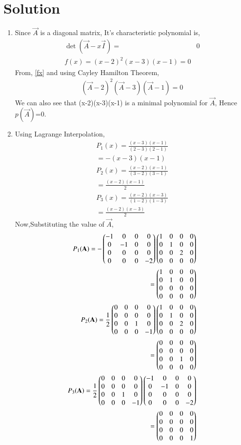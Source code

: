 \documentclass[journal,12pt,twocolumn]{IEEEtran}
\begin{document}
\section{\textbf{Solution}}
\begin{enumerate}
\item{
Since $\vec{A}$ is a diagonal matrix, It's characteristic polynomial is,
\begin{align}
\det{(\vec{A} - x \vec{I})} =&0\\
f(x)=(x-2)^2(x-3)(x-1)=0\label{fx}
\end{align}
From, \eqref{fx} and using Cayley Hamilton Theorem,
\begin{align}
(\vec{A}-2)^2(\vec{A}-3)(\vec{A}-1)=0
\end{align}
We can also see that (x-2)(x-3)(x-1) is a minimal polynomial for $\vec{A}$, Hence $p(\vec{A})$=0.}
\item{Using Lagrange Interpolation,
\begin{align}
P_1(x)=\frac{(x-3)(x-1)}{(2-3)(2-1)}\\
=-(x-3)(x-1)\\
P_2(x)=\frac{(x-2)(x-1)}{(3-2)(3-1)}\\
=\frac{(x-2)(x-1)}{2}\\
P_3(x)=\frac{(x-2)(x-3)}{(1-2)(1-3)}\\
=\frac{(x-2)(x-3)}{2}
\end{align}
Now,Substituting the value of $\vec{A}$,
\begin{align}
P_1(\mathbf{A})=-\begin{pmatrix}-1&0&0&0\\0&-1&0&0\\0&0&0&0\\0&0&0&-2\end{pmatrix}\begin{pmatrix}1&0&0&0\\0&1&0&0\\0&0&2&0\\0&0&0&0\end{pmatrix}\\=\begin{pmatrix}1&0&0&0\\0&1&0&0\\0&0&0&0\\0&0&0&0\end{pmatrix}\\
P_2(\mathbf{A})=\frac{1}{2}\begin{pmatrix}0&0&0&0\\0&0&0&0\\0&0&1&0\\0&0&0&-1\end{pmatrix}\begin{pmatrix}1&0&0&0\\0&1&0&0\\0&0&2&0\\0&0&0&0\end{pmatrix}\\=\begin{pmatrix}0&0&0&0\\0&0&0&0\\0&0&1&0\\0&0&0&0\end{pmatrix}\\
P_3(\mathbf{A})=\frac{1}{2}\begin{pmatrix}0&0&0&0\\0&0&0&0\\0&0&1&0\\0&0&0&-1\end{pmatrix}\begin{pmatrix}-1&0&0&0\\0&-1&0&0\\0&0&0&0\\0&0&0&-2\end{pmatrix}\\=\begin{pmatrix}0&0&0&0\\0&0&0&0\\0&0&0&0\\0&0&0&1\end{pmatrix}
\end{align}}
\end{enumerate}
\end{document}
